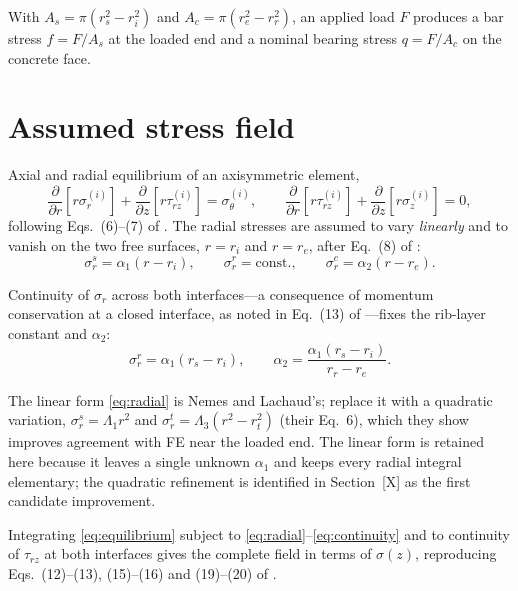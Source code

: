 \noindent With $A_s = \pi(r_s^2 - r_i^2)$ and $A_c = \pi(r_e^2 - r_r^2)$, an applied load
$F$ produces a bar stress $f = F/A_s$ at the loaded end and a nominal bearing
stress $q = F/A_c$ on the concrete face.

\section{Assumed stress field}
\label{sec:field}

Axial and radial equilibrium of an axisymmetric element,
\begin{equation}
\label{eq:equilibrium}
\frac{\partial}{\partial r}\!\left[r\sigma_r^{(i)}\right]
  + \frac{\partial}{\partial z}\!\left[r\tau_{rz}^{(i)}\right]
  = \sigma_\theta^{(i)},
\qquad
\frac{\partial}{\partial r}\!\left[r\tau_{rz}^{(i)}\right]
  + \frac{\partial}{\partial z}\!\left[r\sigma_z^{(i)}\right] = 0,
\end{equation}
following Eqs.~(6)--(7) of \textcite{nemesModelingCylindricalAdhesively2009}. The radial
stresses are assumed to vary \emph{linearly} and to vanish on the two free
surfaces, $r = r_i$ and $r = r_e$, after Eq.~(8) of
\textcite{nemesModelingCylindricalAdhesively2009}:
\begin{equation}
\label{eq:radial}
\sigma_r^{s} = \alpha_1 (r - r_i), \qquad
\sigma_r^{r} = \text{const.}, \qquad
\sigma_r^{c} = \alpha_2 (r - r_e).
\end{equation}

Continuity of $\sigma_r$ across both interfaces---a consequence of momentum
conservation at a closed interface, as noted in Eq.~(13) of
\textcite{alaviAnalyticalProcedureFailure2025}---fixes the rib-layer constant
and $\alpha_2$:
\begin{equation}
\label{eq:continuity}
\sigma_r^{r} = \alpha_1 (r_s - r_i), \qquad
\alpha_2 = \frac{\alpha_1 (r_s - r_i)}{r_r - r_e}.
\end{equation}

The linear form \eqref{eq:radial} is Nemes and Lachaud's;
\textcite{alaviAnalyticalProcedureFailure2025} replace it with a quadratic
variation, $\sigma_r^{s} = \Lambda_1 r^2$ and
$\sigma_r^{t} = \Lambda_3(r^2 - r_t^2)$ (their Eq.~6), which they show
improves agreement with FE near the loaded end. The linear form is retained
here because it leaves a single unknown $\alpha_1$ and keeps every radial
integral elementary; the quadratic refinement is identified in Section~[X] as
the first candidate improvement.

Integrating \eqref{eq:equilibrium} subject to
\eqref{eq:radial}--\eqref{eq:continuity} and to continuity of $\tau_{rz}$ at
both interfaces gives the complete field in terms of $\sigma(z)$, reproducing
Eqs.~(12)--(13), (15)--(16) and (19)--(20) of
\textcite{nemesModelingCylindricalAdhesively2009}.

